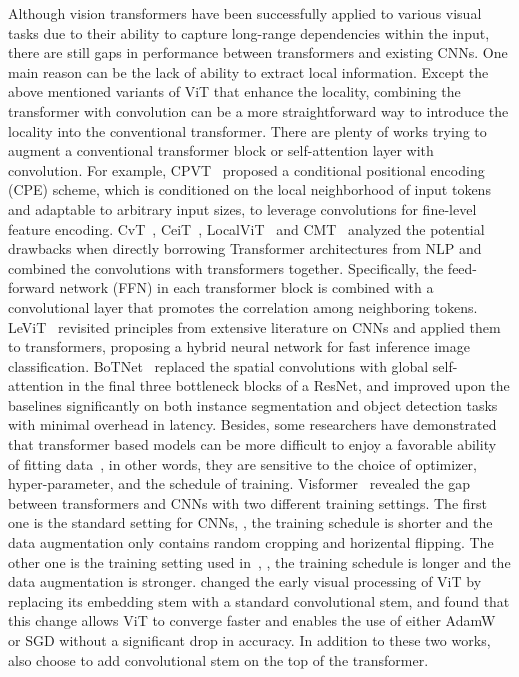 Although vision transformers have been successfully applied to various visual tasks due to their ability to capture long-range dependencies within the input, there are still gaps in performance between transformers and existing CNNs. One main reason can be the lack of ability to extract local information. Except the above mentioned variants of ViT that enhance the locality, combining the transformer with convolution can be a more straightforward way to introduce the locality into the conventional transformer. 
There are plenty of works trying to augment a conventional transformer block or self-attention layer with convolution. For example, CPVT~ proposed a conditional positional encoding (CPE) scheme, which is conditioned on the local neighborhood of input tokens and adaptable to arbitrary input sizes, to leverage convolutions for fine-level feature encoding. CvT~, CeiT~, LocalViT~ and CMT~ analyzed the potential drawbacks when directly borrowing Transformer architectures from NLP and combined the convolutions with transformers together. Specifically, the feed-forward network (FFN) in each transformer block is combined with a convolutional layer that promotes the correlation among neighboring tokens. LeViT~ revisited principles from extensive literature on CNNs and applied them to transformers, proposing a hybrid neural network for fast inference image classification. BoTNet~ replaced the spatial convolutions with global self-attention in the final three bottleneck blocks of a ResNet, and improved upon the baselines significantly on both instance segmentation and object detection tasks with minimal overhead in latency.
Besides, some researchers have demonstrated that transformer based models can be more difficult to enjoy a favorable ability of fitting data~, in other words, they are sensitive to the choice of optimizer, hyper-parameter, and the schedule of training. Visformer~ revealed the gap between transformers and CNNs with two different training settings. The first one is the standard setting for CNNs, \ie, the training schedule is shorter and the data augmentation only contains random cropping and horizental flipping. The other one is the training setting used in~, \ie, the training schedule is longer and the data augmentation is stronger.  changed the early visual processing of ViT by replacing its embedding stem with a standard convolutional stem, and found that this change allows ViT to converge faster and enables the use of either AdamW or SGD without a significant drop in accuracy. In addition to these two works,  also choose to add convolutional stem on the top of the transformer.
